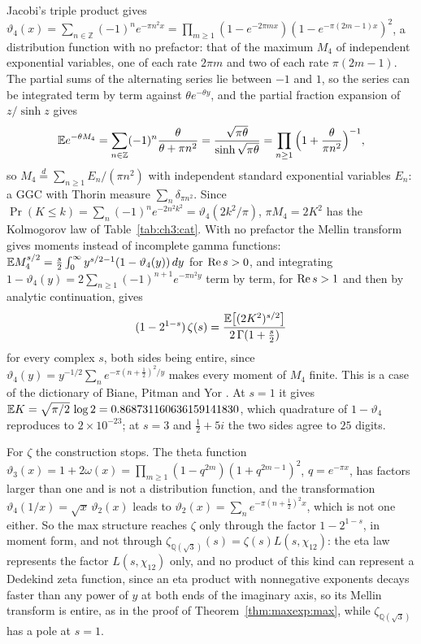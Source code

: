 Jacobi's triple product gives $\vartheta_4(x)=\sum_{n\in\mathbb Z}(-1)^ne^{-\pi n^2x}=\prod_{m\ge1}(1-e^{-2\pi mx})(1-e^{-\pi(2m-1)x})^2$, a distribution function with no prefactor: that of the maximum $M_4$ of independent exponential variables, one of each rate $2\pi m$ and two of each rate $\pi(2m-1)$. The partial sums of the alternating series lie between $-1$ and $1$, so the series can be integrated term by term against $\theta e^{-\theta y}$, and the partial fraction expansion of $z/\sinh z$ gives
\[
\mathbb{E} e^{-\theta M_4}=\sum_{n\in\mathbb Z}(-1)^n\frac\theta{\theta+\pi n^2}=\frac{\sqrt{\pi\theta}}{\sinh\sqrt{\pi\theta}}=\prod_{n\ge1}\Big(1+\frac\theta{\pi n^2}\Big)^{-1},
\]
so $M_4\overset d=\sum_{n\ge1}E_n/(\pi n^2)$ with independent standard exponential variables $E_n$: a GGC with Thorin measure $\sum_n\delta_{\pi n^2}$. Since $\Pr(K\le k)=\sum_n(-1)^ne^{-2n^2k^2}=\vartheta_4(2k^2/\pi)$, $\pi M_4=2K^2$ has the Kolmogorov law of Table~\ref{tab:ch3:cat}. With no prefactor the Mellin transform gives moments instead of incomplete gamma functions: $\mathbb{E} M_4^{s/2}=\frac s2\int_0^\infty y^{s/2-1}(1-\vartheta_4(y))\,dy$ for $\operatorname{Re} s>0$, and integrating $1-\vartheta_4(y)=2\sum_{n\ge1}(-1)^{n+1}e^{-\pi n^2y}$ term by term, for $\operatorname{Re} s>1$ and then by analytic continuation, gives
\[
(1-2^{1-s})\,\zeta(s)=\frac{\mathbb{E}\big[(2K^2)^{s/2}\big]}{2\,\Gamma(1+\frac s2)}
\]
for every complex $s$, both sides being entire, since $\vartheta_4(y)=y^{-1/2}\sum_ne^{-\pi(n+\frac12)^2/y}$ makes every moment of $M_4$ finite. This is a case of the dictionary of Biane, Pitman and Yor \cite{BPY01}. At $s=1$ it gives $\mathbb{E} K=\sqrt{\pi/2}\,\log2=0.868731160636159141830$, which quadrature of $1-\vartheta_4$ reproduces to $2\times10^{-23}$; at $s=3$ and $\frac12+5i$ the two sides agree to $25$ digits.

For $\zeta$ the construction stops. The theta function $\vartheta_3(x)=1+2\omega(x)=\prod_{m\ge1}(1-q^{2m})(1+q^{2m-1})^2$, $q=e^{-\pi x}$, has factors larger than one and is not a distribution function, and the transformation $\vartheta_4(1/x)=\sqrt x\,\vartheta_2(x)$ leads to $\vartheta_2(x)=\sum_ne^{-\pi(n+\frac12)^2x}$, which is not one either. So the max structure reaches $\zeta$ only through the factor $1-2^{1-s}$, in moment form, and not through $\zeta_{\mathbb Q(\sqrt3)}(s)=\zeta(s)L(s,\chi_{12})$: the eta law represents the factor $L(s,\chi_{12})$ only, and no product of this kind can represent a Dedekind zeta function, since an eta product with nonnegative exponents decays faster than any power of $y$ at both ends of the imaginary axis, so its Mellin transform is entire, as in the proof of Theorem~\ref{thm:maxexp:max}, while $\zeta_{\mathbb Q(\sqrt3)}$ has a pole at $s=1$.

